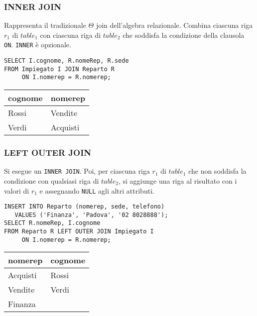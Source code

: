 \documentclass[a4paper, 10pt, titlepage]{article}
\begin{document}
\subsubsection*{INNER JOIN}
			Rappresenta il tradizionale $ \Theta $ join dell’algebra relazionale.
			Combina ciascuna riga $ r_1 $ di $ table_1 $ con ciascuna riga di $ table_2 $ che soddisfa la condizione della clausola \lstinline|ON|. \lstinline|INNER| è opzionale.
			
			\bigskip
			\noindent
			\begin{minipage}{0.6\textwidth}
					\begin{lstlisting}
SELECT I.cognome, R.nomeRep, R.sede
FROM Impiegato I JOIN Reparto R
     ON I.nomerep = R.nomerep;
				\end{lstlisting}
				\end{minipage}\hfilneg\vrule\hfill
			\begin{minipage}{0.33\textwidth}
				\begin{tabular}{ll}
						\toprule
						\textbf{cognome} & \textbf{nomerep} \\
						\midrule
						Rossi & Vendite \\
						Verdi & Acquisti \\
						\midrule
					\end{tabular}
				\end{minipage}
			
		\subsubsection*{LEFT OUTER JOIN}
			Si esegue un \lstinline|INNER JOIN|. Poi, per ciascuna riga $ r_1 $ di $ table_1 $ che non
			soddisfa la condizione con qualsiasi riga di $ table_2 $, si aggiunge una riga al
			risultato con i valori di $ r_1 $ e assegnando \lstinline|NULL| agli altri attributi.
			
			\bigskip
			\noindent
			\begin{minipage}{0.7\textwidth}
					\begin{lstlisting}
INSERT INTO Reparto (nomerep, sede, telefono)
   VALUES ('Finanza', 'Padova', '02 8028888');
SELECT R.nomeRep, I.cognome
FROM Reparto R LEFT OUTER JOIN Impiegato I 
     ON I.nomerep = R.nomerep;
				\end{lstlisting}
				\end{minipage}\hfilneg\vrule\hfill
			\begin{minipage}{.27\textwidth}
					\begin{tabular}{ll}
						\toprule
						\textbf{nomerep} & \textbf{cognome} \\
						\midrule
						Acquisti & Rossi \\
						Vendite & Verdi  \\
						Finanza &  \\
						\midrule
					\end{tabular}
				\end{minipage}
		
\end{document}
